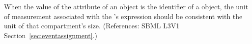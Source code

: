 When the value of the attribute  of an \EventAssignment
object is the identifier of a \Compartment object, the unit of measurement
associated with the \EventAssignment's  expression should be
consistent with the unit of that compartment's size.  (References: SBML
L3V1 Section~\ref{sec:eventassignment}.)
